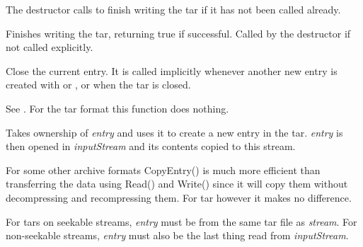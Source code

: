 
The destructor calls  to finish
writing the tar if it has not been called already.


\label{wxtaroutputstreamclose}


Finishes writing the tar, returning true if successful.
Called by the destructor if not called explicitly.


\label{wxtaroutputstreamcloseentry}


Close the current entry. It is called implicitly whenever another new
entry is created with 
or , or
when the tar is closed.


\label{wxtaroutputstreamcopyarchivemetadata}


See .
For the tar format this function does nothing.


\label{wxtaroutputstreamcopyentry}


Takes ownership of {\it entry} and uses it to create a new entry
in the tar. {\it entry} is then opened in {\it inputStream} and its contents
copied to this stream.

For some other archive formats CopyEntry() is much more efficient than
transferring the data using Read() and Write() since it will copy them
without decompressing and recompressing them. For tar however it makes
no difference.

For tars on seekable streams, {\it entry} must be from the same tar file
as {\it stream}. For non-seekable streams, {\it entry} must also be the
last thing read from {\it inputStream}.


\label{wxtaroutputstreamblockingfactor}


